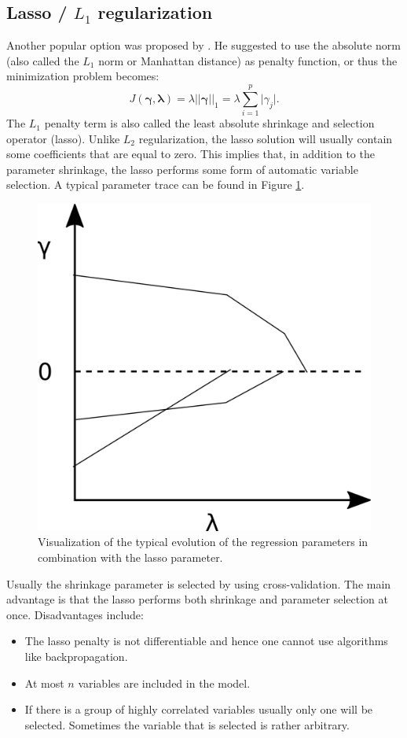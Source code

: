 \subsection{Lasso / $L_1$ regularization}
\label{sec:Lasso}
Another popular option was proposed by \cite{tibshirani_regression_1996}. He suggested to use the absolute norm (also called the $L_1$ norm or Manhattan distance) as penalty function, or thus the minimization problem becomes: 
\[J(\bm{\gamma},\bm{\lambda}) = \lambda \vert \vert \bm{\gamma} \vert \vert _1 = \lambda \sum_{i=1}^p \vert \gamma_j \vert.\]
The $L_1$ penalty term is also called the least absolute shrinkage and selection operator (lasso). Unlike $L_2$ regularization, the lasso solution will usually contain some coefficients that are equal to zero. This implies that, in addition to the parameter shrinkage, the lasso performs some form of automatic variable selection. A typical parameter trace can be found in Figure \ref{fig:LassoTrace}. \\
\begin{figure}[!htb]
\centering
\includegraphics[scale=0.75]{VectorGraphics/lassoTrace.png}
\caption{\label{fig:LassoTrace}Visualization of the typical evolution of the regression parameters in combination with the lasso parameter.}
\end{figure}

Usually the shrinkage parameter is selected by using cross-validation. The main advantage is that the lasso performs both shrinkage and parameter selection at once. Disadvantages include:
\begin{itemize}
\item The lasso penalty is not differentiable and hence one cannot use algorithms like backpropagation.
\item At most $n$ variables are included in the model.
\item If there is a group of highly correlated variables usually only one will be selected. Sometimes the variable that is selected is rather arbitrary.
\end{itemize}

